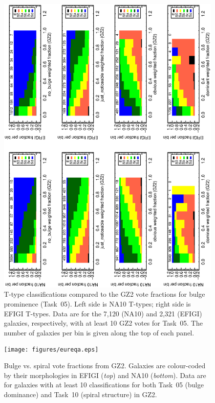 \documentclass[useAMS,usenatbib]{mn2e}
\begin{document}
\begin{figure}
\includegraphics[angle=-90,width=7.0in]{figures/bulgeprominence_color.ps}
\caption{T-type classifications compared to the GZ2 vote fractions for bulge prominence (Task~05). Left side is NA10 T-types; right side is EFIGI T-types. Data are for the 7,120 (NA10) and 2,321 (EFIGI) galaxies, respectively, with at least 10 GZ2 votes for Task~05. The number of galaxies per bin is given along the top of each panel. 
\label{fig-bulgeprominence}}
\end{figure}

\begin{figure}
\texttt{[image: figures/eureqa.eps]}
\caption{Bulge vs. spiral vote fractions from GZ2. Galaxies are colour-coded by their morphologies in EFIGI ({\it top}) and NA10 ({\it bottom}). Data are for galaxies with at least 10 classifications for both Task~05 (bulge dominance) and Task~10 (spiral structure) in GZ2. 
\label{fig-eureqa}}
\end{figure}
\end{document}
